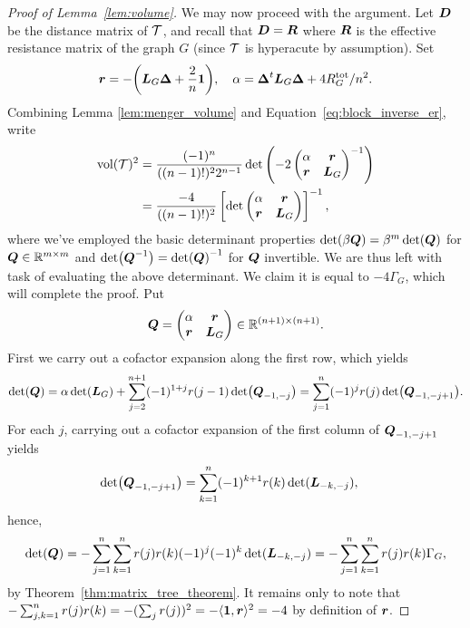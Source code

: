 \begin{proof}[Proof of Lemma~\ref{lem:volume}]
	We may now proceed  with the argument. 
	Let $\vb*{D}$ be the distance matrix of $\mathcal{T}$, and recall that $\vb*{D}=\vb*{R}$ where $\vb*{R}$ is the effective resistance matrix of the graph $G$ (since $\mathcal{T}$ is hyperacute by assumption). 
	Set \[\vb*{r}=-\bigg(\vb*{L}_G\vb*{\Delta} + \frac{2}{n}\vb{1}\bigg), \quad \alpha = \vb*{\Delta}^t \vb*{L}_G\vb*{\Delta} + 4R^{\textnormal{tot}}_G/n^2.\] 
	Combining Lemma \ref{lem:menger_volume} and Equation~\eqref{eq:block_inverse_er}, write 
	\begin{align*}
	\textnormal{vol}(\mathcal{T})^2 &= \frac{(-1)^n }{((n-1)!)^2 2^{n-1}} \det\left(-2\begin{pmatrix}
	\alpha & \vb*{r} \\
	\vb*{r} & \vb*{L}_G
	\end{pmatrix}^{-1}\right) \\
	&= \frac{ -4}{((n-1)!)^2}\left[\det\begin{pmatrix}
	\alpha & \vb*{r} \\
	\vb*{r} & \vb*{L}_G
	\end{pmatrix}\right]^{-1},
	\end{align*}
	where we've employed the basic determinant properties $\det( \beta\vb*{Q})=\beta^{m}\det(\vb*{Q})$ for $\vb*{Q}\in\mathbb{R}^{m\times m}$ and $\det(\vb*{Q}^{-1})=\det(\vb*{Q})^{-1}$ for $\vb*{Q}$ invertible. We are thus left with task of evaluating the above determinant. We claim it is equal to $-4\Gamma_G$,  which will complete the proof. 
	Put 
	\[\vb*{Q} = \begin{pmatrix}
	\alpha & \vb*{r}\\ \vb*{r}& \vb*{L}_G
	\end{pmatrix}\in\mathbb{R}^{(n+1)\times (n+1)}.\]
	First we carry out a cofactor expansion along the first row, which yields 
	\begin{align*}
	\det(\vb*{Q}) = \alpha \det(\vb*{L}_G) + \sum_{j=2}^{n+1}(-1)^{1+j}r({j-1}) \det(\vb*{Q}_{-1,-j}) = \sum_{j=1}^n (-1)^j r(j) \det(\vb*{Q}_{-1,-j+1}).
	\end{align*}
	For each $j$, carrying out a cofactor expansion of the first column of $\vb*{Q}_{-1,-j+1}$ yields 
	\begin{align*}
	\det(\vb*{Q}_{-1,-j+1}) &= \sum_{k=1}^n (-1)^{k+1}r(k) \det(\vb*{L}_{-k,-j}),
	\end{align*}
	hence, 
	\begin{align*}
	\det(\vb*{Q}) = - \sum_{j=1}^n \sum_{k=1}^n r(j)r(k)(-1)^j(-1)^k  \det(\vb*{L}_{-k,-j}) = - \sum_{j=1}^n \sum_{k=1}^n r(j)r(k)\Gamma_G,
	\end{align*}
	by Theorem~\ref{thm:matrix_tree_theorem}. It remains only to note that 
	$-\sum_{j,k=1}^n r(j) r(k) = -(\sum_j r(j))^2 = - \langle \vb{1},\vb*{r}\rangle ^2 = - 4$ 
	by  definition  of $\vb*{r}$. 
\end{proof}

